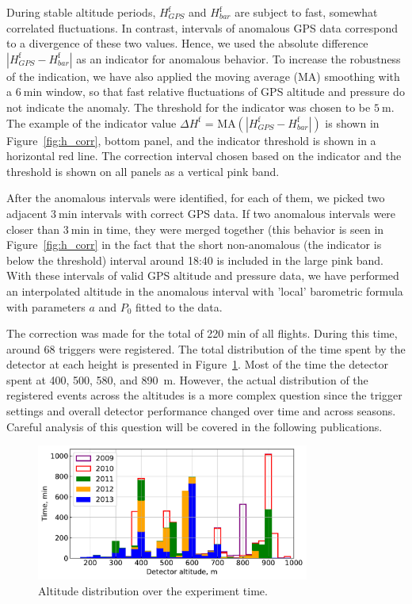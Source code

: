 \documentclass[universe,article,accept,moreauthors,pdftex]{Definitions/mdpi}
\begin{document}
During stable altitude periods, $H_{GPS}^{\textrm{f}}$ and $H_{bar}^{\textrm{f}}$ are subject to fast, somewhat correlated fluctuations. In contrast, intervals of anomalous GPS data correspond to a divergence of these two values. Hence, we used the absolute difference $|H_{GPS}^{\textrm{f}} - H_{bar}^{\textrm{f}}|$ as an indicator for anomalous behavior. To increase the robustness of the indication, we have also applied the moving average (MA) smoothing with a $6~\textrm{min}$ window, so that fast relative fluctuations of GPS altitude and pressure do not indicate the anomaly. The threshold for the indicator was chosen to be $5~\textrm{m}$. The example of the indicator value $\Delta H^\textrm{f}$ = $\textrm{MA}(|H_{GPS}^{\textrm{f}} - H_{bar}^{\textrm{f}}|)$ is shown in Figure~\ref{fig:h_corr}, bottom panel, and the indicator threshold is shown in a horizontal red line. The correction interval chosen based on the indicator and the threshold is shown on all panels as a vertical pink band.

After the anomalous intervals were identified, for each of them, we picked two adjacent $3~\textrm{min}$ intervals with correct GPS data. If two anomalous intervals were closer than $3~\textrm{min}$ in time, they were merged together (this behavior is seen in Figure~\ref{fig:h_corr} in the fact that the short non-anomalous (the indicator is below the threshold) interval around 18:40 is included in the large pink band. With these intervals of valid GPS altitude and pressure data, we have performed an interpolated altitude in the anomalous interval with 'local' barometric formula with parameters $a$ and $P_0$ fitted to the data.



The correction was made for the total of 220 min of all flights. During this time, around 68 triggers were registered. The total distribution of the time spent by the detector at each height is presented in Figure~\ref{fig:time_on_altitude}. Most of the time the detector spent at 400, 500, 580, and 890~m. However, the actual distribution of the registered events across the altitudes is a more complex question since the trigger settings and overall detector performance changed over time and across seasons. Careful analysis of this question will be covered in the following publications.

\begin{figure}[H]
    \includegraphics[width=0.8\textwidth]{figs/time_on_altitude_c.pdf}%
    \caption{Altitude distribution over the experiment time.}
    \label{fig:time_on_altitude}
\end{figure}
\end{document}
